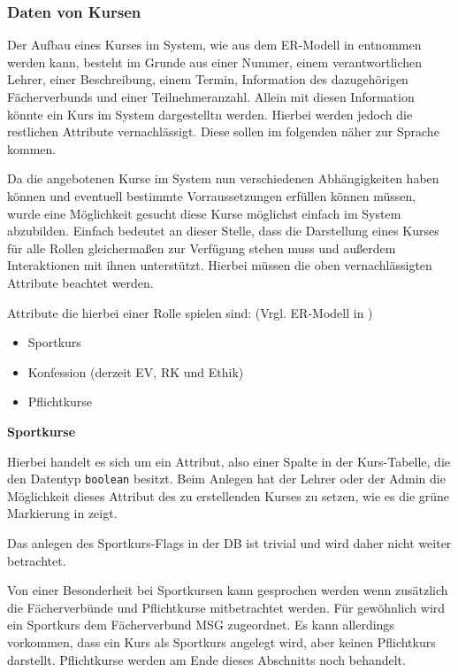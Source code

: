 \subsubsection{Daten von Kursen}

Der Aufbau eines Kurses im System, wie aus dem ER-Modell in  entnommen werden kann, besteht im Grunde aus einer Nummer, einem verantwortlichen Lehrer, einer Beschreibung, einem Termin, Information des dazugehörigen Fächerverbunds  und einer Teilnehmeranzahl. Allein mit diesen Information könnte ein Kurs im System dargestelltn werden. Hierbei werden jedoch die restlichen Attribute vernachlässigt. Diese sollen im folgenden näher zur Sprache kommen.  

Da die angebotenen Kurse im System nun verschiedenen Abhängigkeiten haben können und eventuell bestimmte Vorraussetzungen erfüllen können müssen, wurde eine Möglichkeit gesucht diese Kurse möglichst einfach im System abzubilden. 
Einfach bedeutet an dieser Stelle, dass die Darstellung eines Kurses für alle Rollen gleichermaßen zur Verfügung stehen muss und außerdem Interaktionen mit ihnen unterstützt.
Hierbei müssen die oben vernachlässigten Attribute beachtet werden. 

Attribute die hierbei einer Rolle spielen sind: (Vrgl. ER-Modell in )
\begin{itemize}
  \item Sportkurs
  \item Konfession (derzeit EV, RK und Ethik)
  \item Pflichtkurse
\end{itemize}

\textbf{Sportkurse}

Hierbei handelt es sich um ein Attribut, also einer Spalte in der Kurs-Tabelle, die den Datentyp \texttt{boolean} besitzt.
Beim Anlegen hat der Lehrer oder der Admin die Möglichkeit dieses Attribut des zu erstellenden Kurses zu setzen, wie es die grüne Markierung in  zeigt.

Das anlegen des Sportkurs-Flags in der DB ist trivial und wird daher nicht weiter betrachtet.

Von einer Besonderheit bei Sportkursen kann gesprochen werden wenn zusätzlich die Fächerverbünde und Pflichtkurse mitbetrachtet werden.
Für gewöhnlich wird ein Sportkurs dem Fächerverbund \ac{MSG} zugeordnet. Es kann allerdings vorkommen, dass ein Kurs als Sportkurs angelegt wird, aber keinen Pflichtkurs darstellt.  
Pflichtkurse werden am Ende dieses Abschnitts noch behandelt.


